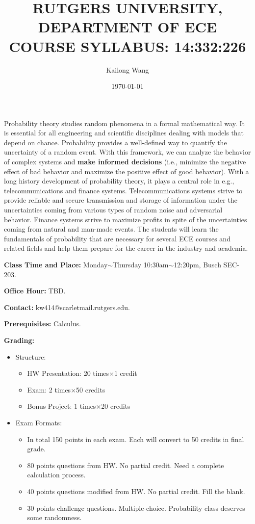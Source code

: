 \documentclass{article}
\title{RUTGERS UNIVERSITY, DEPARTMENT OF ECE \\
COURSE SYLLABUS: 14:332:226}
\author{Kailong Wang}
\date{\today}
\begin{document}
\maketitle
Probability theory studies random phenomena in a formal mathematical way. It is essential for all engineering and scientific disciplines dealing with models that depend on chance.
Probability provides a well-defined way to quantify the uncertainty of a random event. With this framework, we can analyze the behavior of complex systems and \textbf{make informed decisions} (i.e., minimize the negative effect of bad behavior and maximize the positive effect of good behavior).
With a long history development of probability theory, it plays a central role in e.g.,  telecommunications and finance systems. Telecommunications systems strive to provide reliable and secure transmission and storage of information under the uncertainties coming from various types of random noise and adversarial behavior. Finance systems strive to maximize profits in spite of the uncertainties coming from natural and man-made events.
The students will learn the fundamentals of probability that are necessary for several ECE courses and related fields and help them prepare for the career in the industry and academia.

\textbf{Class Time and Place:} Monday$\sim$Thursday 10:30am$\sim$12:20pm, Busch SEC-203.

\textbf{Office Hour:} TBD.

\textbf{Contact:} kw414@scarletmail.rutgers.edu.

\textbf{Prerequisites:} Calculus.

\textbf{Grading:} {
    \begin{itemize}
        \item Structure: {
            \begin{itemize}
                \item HW Presentation: 20 times$\times$1 credit
                \item Exam: 2 times$\times$50 credits
                \item Bonus Project: 1 times$\times$20 credits
            \end{itemize}
        }
        \item Exam Formats: {
            \begin{itemize}
                \item In total 150 points in each exam. Each will convert to 50 credits in final grade.
                \item 80 points questions from HW. No partial credit. Need a complete calculation process.
                \item 40 points questions modified from HW. No partial credit. Fill the blank.
                \item 30 points challenge questions. Multiple-choice. Probability class deserves some randomness.
            \end{itemize}
        }
    \end{itemize}
}
\end{document}
